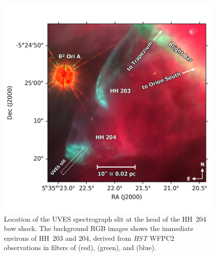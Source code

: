\documentclass[twocolumn]{aastex63}
\begin{document}
 
\begin{figure}
  \centering
  \includegraphics[width=\linewidth]{hh204-finding-chart-simple}
  \caption{
    Location of the UVES spectrograph slit at the head of the HH~204 bow shock.
    The background RGB images shows the immediate environs of HH~203 and 204,
    derived from \textit{HST} WFPC2 observations \citep{ODell:1996a} in filters of
    \oiii{} (red), \nii{} (green), and \ha{} (blue).
    }
  \label{fig:hh204-finding-chart-simple}
\end{figure}
\end{document}
